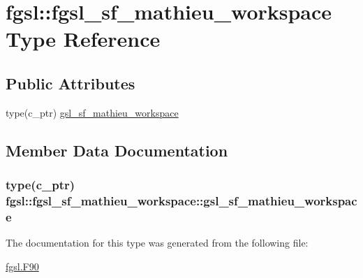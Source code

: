 \hypertarget{structfgsl_1_1fgsl__sf__mathieu__workspace}{}\section{fgsl\+:\+:fgsl\+\_\+sf\+\_\+mathieu\+\_\+workspace Type Reference}
\label{structfgsl_1_1fgsl__sf__mathieu__workspace}
\subsection*{Public Attributes}
\begin{DoxyCompactItemize}
\item 
type(c\+\_\+ptr) \hyperlink{structfgsl_1_1fgsl__sf__mathieu__workspace_ac31295040f13829a0269cacee4858e08}{gsl\+\_\+sf\+\_\+mathieu\+\_\+workspace}
\end{DoxyCompactItemize}


\subsection{Member Data Documentation}
\hypertarget{structfgsl_1_1fgsl__sf__mathieu__workspace_ac31295040f13829a0269cacee4858e08}{}
\subsubsection[{gsl\+\_\+sf\+\_\+mathieu\+\_\+workspace}]{\setlength{\rightskip}{0pt plus 5cm}type(c\+\_\+ptr) fgsl\+::fgsl\+\_\+sf\+\_\+mathieu\+\_\+workspace\+::gsl\+\_\+sf\+\_\+mathieu\+\_\+workspace}\label{structfgsl_1_1fgsl__sf__mathieu__workspace_ac31295040f13829a0269cacee4858e08}


The documentation for this type was generated from the following file\+:\begin{DoxyCompactItemize}
\item 
\hyperlink{fgsl_8F90}{fgsl.\+F90}\end{DoxyCompactItemize}
